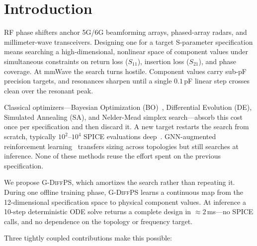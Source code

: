 \documentclass[sigconf,anonymous,review]{acmart}
\newcommand{\gdiffps}{\textsc{G-DiffPS}}
\begin{document}


\maketitle
\pagestyle{plain}

\section{Introduction}
\label{sec:intro}

RF phase shifters anchor 5G/6G beamforming arrays, phased-array radars, and
millimeter-wave transceivers.  Designing one for a target S-parameter
specification means searching a high-dimensional, nonlinear space of component
values under simultaneous constraints on return loss ($S_{11}$), insertion
loss ($S_{21}$), and phase coverage.  At mmWave the search turns hostile.
Component values carry sub-pF precision targets, and resonances sharpen until
a single $0.1$\,pF linear step crosses clean over the resonant peak.

Classical optimizers---Bayesian Optimization (BO)~\cite{hakhamaneshi2022},
Differential Evolution (DE), Simulated Annealing (SA), and Nelder-Mead simplex
search---absorb this cost once per specification and then discard it.  A new
target restarts the search from scratch, typically $10^2$--$10^4$ SPICE
evaluations deep~\cite{hakhamaneshi2022}.  GNN-augmented reinforcement
learning~\cite{wang2020gcnrl,gcx2023} transfers sizing across topologies but
still searches at inference.  None of these methods reuse the effort spent on
the previous specification.

We propose \gdiffps{}, which amortizes the search rather than repeating it.
During one offline training phase, \gdiffps{} learns a continuous map from the
12-dimensional specification space to physical component values.  At inference
a 10-step deterministic ODE solve returns a complete design in
${\approx}2$\,ms---no SPICE calls, and no dependence on the topology or
frequency target.

Three tightly coupled contributions make this possible:
\end{document}
